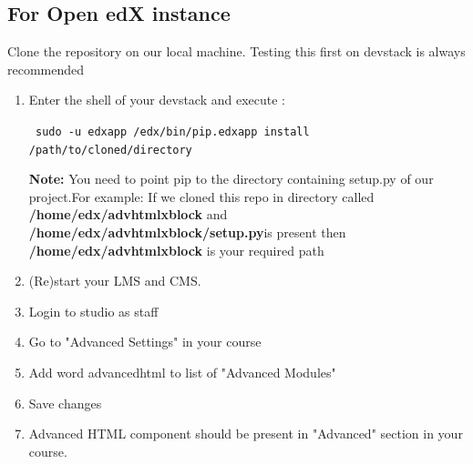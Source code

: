 \subsection{For Open edX instance}
Clone the repository on our local machine. Testing this first on devstack is always recommended
\begin{enumerate}
\item Enter the shell of your devstack and execute :
\begin{center}\verb= sudo -u edxapp /edx/bin/pip.edxapp install /path/to/cloned/directory=\end{center}
\textbf{Note:} You need to point pip to the directory containing setup.py of our project.\newline For
example: If we cloned this repo in directory called\textbf{ /home/edx/advhtmlxblock} and
\textbf{/home/edx/advhtmlxblock/setup.py}is present then\textbf{ /home/edx/advhtmlxblock} is your
required path
\item (Re)start your LMS and CMS.
\item Login to studio as staff
\item Go to "Advanced Settings" in your course
\item Add word advancedhtml to list of "Advanced Modules"
\item Save changes
\item Advanced HTML component should be present in "Advanced" section in your course.
\end{enumerate}



